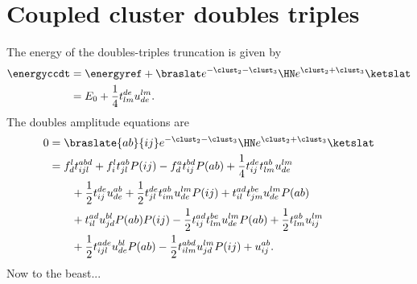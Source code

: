     \section{Coupled cluster doubles triples}
        The energy of the doubles-triples truncation is given by
        \begin{align}
            \energyccdt
            &= \energyref
            + \braslat e^{-\clust_2 - \clust_3} \HN e^{\clust_2 + \clust_3}
            \ketslat
            \\
            &=
            E_0
            + \frac{1}{4} t^{de}_{lm} u^{lm}_{de}.
        \end{align}
        The doubles amplitude equations are
        \begin{align}
            0 & = \braslate{ab}{ij} e^{-\clust_2 - \clust_3} \HN
            e^{\clust_2 + \clust_3}\ketslat
            \\
            &=
            f^{l}_{d} t^{abd}_{ijl}
            + f^{l}_{i} t^{ab}_{jl} P(ij)
            - f^{a}_{d} t^{bd}_{ij} P(ab)
            + \frac{1}{4} t^{de}_{ij} t^{ab}_{lm} u^{lm}_{de}
            \nonumber \\
            &\qquad
            + \frac{1}{2} t^{de}_{ij} u^{ab}_{de}
            + \frac{1}{2} t^{de}_{jl} t^{ab}_{im} u^{lm}_{de} P(ij)
            + t^{ad}_{il} t^{be}_{jm} u^{lm}_{de} P(ab)
            \nonumber \\
            &\qquad
            + t^{ad}_{il} u^{bl}_{jd} P(ab) P(ij)
            - \frac{1}{2} t^{ad}_{ij} t^{be}_{lm} u^{lm}_{de} P(ab)
            + \frac{1}{2} t^{ab}_{lm} u^{lm}_{ij}
            \nonumber \\
            &\qquad
            + \frac{1}{2} t^{ade}_{ijl} u^{bl}_{de} P(ab)
            - \frac{1}{2} t^{abd}_{ilm} u^{lm}_{jd} P(ij)
            + u^{ab}_{ij}.
        \end{align}
        Now to the beast...

